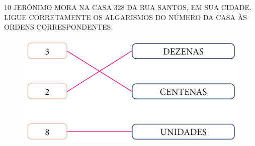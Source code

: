 \num{10} JERÔNIMO MORA NA CASA 328 DA RUA SANTOS, EM SUA
CIDADE. LIGUE CORRETAMENTE OS ALGARISMOS DO NÚMERO DA CASA ÀS ORDENS
CORRESPONDENTES.

\begin{figure}[htpb!]
\centering
\includegraphics[width=.5\textwidth]{../ilustracoes/MAT1/SAEB_1ANO_MAT_FIGURA10.png}
\end{figure}








